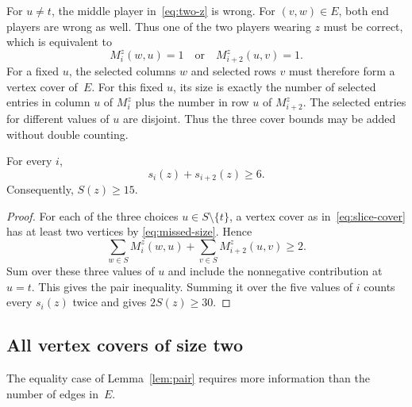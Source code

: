 For $u\ne t$, the middle player in~\eqref{eq:two-z} is wrong. For
$(v,w)\in E$, both end players are wrong as well. Thus one of the two
players wearing $z$ must be correct, which is equivalent to
\begin{equation}\label{eq:slice-cover}
M_i^z(w,u)=1\quad\text{or}\quad M_{i+2}^z(u,v)=1.
\end{equation}
For a fixed $u$, the selected columns $w$ and selected rows $v$ must
therefore form a vertex cover of~$E$.
For this fixed $u$, its size is exactly the number of selected entries
in column $u$ of $M_i^z$ plus the number in row $u$ of $M_{i+2}^z$.
The selected entries for different values of $u$ are disjoint. Thus the
three cover bounds may be added without double counting.

\begin{lemma}\label{lem:pair}
For every $i$,
\[
s_i(z)+s_{i+2}(z)\geq6.
\]
Consequently, $S(z)\geq15$.
\end{lemma}
\begin{proof}
For each of the three choices $u\in S\setminus\{t\}$, a vertex cover as
in~\eqref{eq:slice-cover} has at least two vertices by
\eqref{eq:missed-size}. Hence
\[
\sum_{w\in S}M_i^z(w,u)+\sum_{v\in S}M_{i+2}^z(u,v)\geq2.
\]
Sum over these three values of $u$ and include the nonnegative contribution
at $u=t$. This gives the pair inequality. Summing it over the five values
of $i$ counts every $s_i(z)$ twice and gives $2S(z)\geq30$.
\end{proof}

\subsection{All vertex covers of size two}
The equality case of Lemma~\ref{lem:pair} requires more information than
the number of edges in~$E$.

